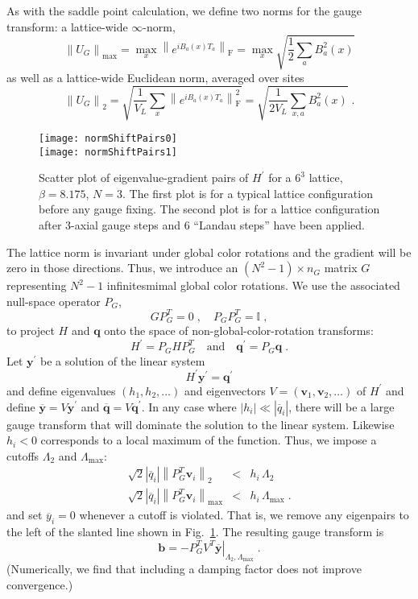 \documentclass[preprint,aps,prd]{revtex4-2}
\newcommand{\be}{\begin{equation}}
\newcommand{\eq}{\end{equation}}
\newcommand{\heigen}{h}
\newcommand\fnorm[1]{\left\lVert #1 \right\rVert_\mathrm{F}}
\begin{document}
As with the saddle point calculation, we define two
norms for the gauge transform:
a lattice-wide $\infty$-norm,
\be
\left\lVert U_G \right\rVert_{\mathrm{max}} =
     \max_{x} \fnorm{e^{i B_{a}(x) T_a}}
     = \max_{x} \sqrt{\frac{1}{2}\sum_a B_a^2(x)}
\eq
as well as a lattice-wide Euclidean norm, averaged over sites
\be
\left\lVert U_G\right\rVert_2 =
      \sqrt{\frac{1}{V_L} \sum_{x}
        \fnorm{e^{i B_{a}(x) T_a}}^2}
     = \sqrt{\frac{1}{2 V_L} \sum_{x, a} B_a^2(x)}
        \; .  \label{normshiftsize}
\eq

\begin{figure}
\texttt{[image: normShiftPairs0]}\\
\texttt{[image: normShiftPairs1]}
\caption{Scatter plot of eigenvalue-gradient pairs of $H^\prime$
  for a $6^3$ lattice, $\beta = 8.175$, $N=3$.
  The first plot is for a typical lattice configuration before any
  gauge fixing.  The second plot is for a lattice configuration
  after 3-axial gauge steps and 6 ``Landau steps'' have been
  applied.
  \label{normShiftPairs}}
\end{figure}

The lattice norm is invariant under global color rotations and
the gradient will be zero in those directions.
Thus, we introduce an $(N^2-1)\times n_G$ matrix $G$
representing $N^2-1$ infinitesmimal global color rotations.
We use the associated null-space operator $P_G$,
\be
G P_G^T = 0 \;, \quad P_G P_G^T = \mathbb{I} \; ,
\eq
to project $H$ and $\mathbf{q}$ onto
the space of non-global-color-rotation transforms:
\be
         H^\prime = P_G H P_G^T \quad \mbox{and} \quad
         \mathbf{q}^\prime = P_G \mathbf{q} \; .
\eq
%
Let $\mathbf{y}^\prime$ be a solution of the linear system
\be
   H^\prime \mathbf{y}^\prime = \mathbf{q}^\prime \label{normlinear2}
\eq
and define eigenvalues
$\left(\heigen_1, \heigen_2, \ldots\right)$ and
eigenvectors $V=\left(\mathbf{v}_1, \mathbf{v}_2, \ldots\right)$
of $H^\prime$ and
define $\overline{\mathbf{y}} = V \mathbf{y}^\prime$ and
$\overline{\mathbf{q}}  = V \mathbf{q}^\prime$.
 In any case where $\left|\heigen_i\right|\ll
\left|\overline{q}_i\right|$,
there will be a large gauge transform that will dominate the solution
to the linear system.
Likewise $\heigen_i<0$ corresponds to a local maximum of the function.
Thus, we impose a cutoffs $\Lambda_2$ and $\Lambda_\mathrm{max}$:
\begin{eqnarray}
    \sqrt{2} \left|\overline{q}_i\right|\left\lVert P_G^T \mathbf{v}_i\right\rVert_2
     &<& \heigen_i \, \Lambda_2 \label{normlambda2}\\
    \sqrt{2} \left|\overline{q}_i\right|
      \left\lVert P_G^T \mathbf{v}_i\right\rVert_\mathrm{max}
    &<& \heigen_i\, \Lambda_\mathrm{max} \; .
\end{eqnarray}
%
and set $\overline{y}_i=0$ whenever a cutoff is violated.
That is, we remove any eigenpairs to the left
of the slanted line shown in Fig.~\ref{normShiftPairs}.
The resulting gauge transform is
\be
      \mathbf{b} = -P_G^T \left. V^T
                    \overline{\mathbf{y}}\right|_{\Lambda_2,\Lambda_\mathrm{max}} \; .
\eq
%
(Numerically, we find that including a damping factor does not
improve convergence.)
\end{document}
